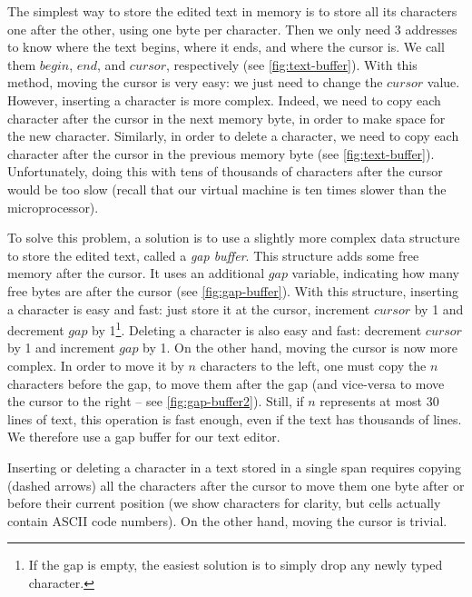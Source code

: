 The simplest way to store the edited text in memory is to store all its
characters one after the other, using one byte per character. Then we only need
3 addresses to know where the text begins, where it ends, and where the cursor
is. We call them $begin$, $end$, and $cursor$, respectively (see
\cref{fig:text-buffer}). With this method, moving the cursor is very easy: we
just need to change the $cursor$ value. However, inserting a
character is more complex. Indeed, we need to copy each character after the
cursor in the next memory byte, in order to make space for the new character.
Similarly, in order to delete a character, we need to copy each character after
the cursor in the previous memory byte (see \cref{fig:text-buffer}).
Unfortunately, doing this with tens of thousands of characters after the cursor
would be too slow (recall that our virtual machine is ten times slower than the
microprocessor).

To solve this problem, a solution is to use a slightly more complex data
structure to store the edited text, called a {\em gap buffer}. This structure
adds some free memory after the cursor. It uses an additional $gap$ variable,
indicating how many free bytes are after the cursor (see
\cref{fig:gap-buffer}). With this structure, inserting a character is easy and
fast: just store it at the cursor, increment $cursor$ by 1 and decrement $gap$
by 1\footnote{If the gap is empty, the easiest solution is to simply drop any
newly typed character.}. Deleting a character is also easy and fast: decrement
$cursor$ by 1 and increment $gap$ by 1. On the other hand, moving the cursor is
now more complex. In order to move it by $n$ characters to the left, one must
copy the $n$ characters before the gap, to move them after the gap (and
vice-versa to move the cursor to the right -- see \cref{fig:gap-buffer2}).
Still, if $n$ represents at most 30 lines of text, this operation is fast
enough, even if the text has thousands of lines. We therefore use a gap buffer
for our text editor.

\begin{Figure}
  

  \caption{Inserting or deleting a character in a text stored in a single span
  requires copying (dashed arrows) all the characters after the cursor to move
  them one byte after or before their current position (we show characters for
  clarity, but cells actually contain ASCII code numbers). On the other hand,
  moving the cursor is trivial.}\label{fig:text-buffer}
\end{Figure}

